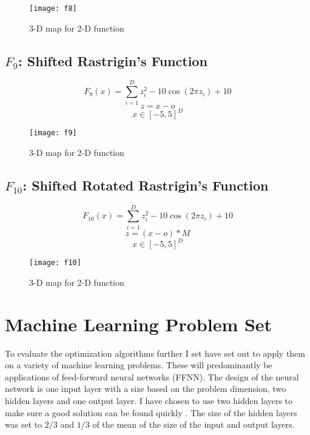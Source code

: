 \begin{figure}[H]
  \centering
  \texttt{[image: f8]}
  \caption{3-D map for 2-D function}
  \label{f8}
\end{figure}

\subsection{$F_9$: Shifted Rastrigin’s Function}

\begin{equation}
  F_9(x)=\sum_{i=1}^{D}{z_i^2 - 10\cos{(2\pi z_i)} + 10}
\end{equation}
\[ z=x-o \]
\[ x \in [-5,5]^D \]

\begin{figure}[H]
  \centering
  \texttt{[image: f9]}
  \caption{3-D map for 2-D function}
  \label{f9}
\end{figure}

\subsection{$F_{10}$: Shifted Rotated Rastrigin’s Function}

\begin{equation}
  F_{10}(x)=\sum_{i=1}^{D}{z_i^2 - 10\cos{(2\pi z_i)} + 10}
\end{equation}
\[ z=(x-o)*M \]
\[ x \in [-5,5]^D \]

\begin{figure}[H]
  \centering
  \texttt{[image: f10]}
  \caption{3-D map for 2-D function}
  \label{f10}
\end{figure}

\section{Machine Learning Problem Set}

To evaluate the optimization algorithms further I set have set out to apply them on a variety of machine learning problems. These will predominantly be applications of feed-forward neural networks (FFNN). The design of the neural network is one input layer with a size based on the problem dimension, two hidden layers and one output layer. I have chosen to use two hidden layers to make sure a good solution can be found quickly \cite{329294}. The size of the hidden layers was set to $2/3$ and $1/3$ of the mean of the size of the input and output layers.

